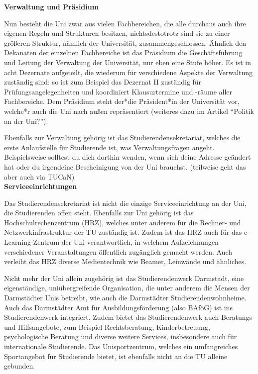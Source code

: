 {    \textbf{Verwaltung und Präsidium}

    Nun besteht die Uni zwar aus vielen Fachbereichen, die alle durchaus auch ihre eigenen Regeln und Strukturen besitzen, nichtsdestotrotz sind sie zu einer größeren Struktur, nämlich der Universität, zusammengeschlossen. Ähnlich den Dekanaten der einzelnen Fachbereiche ist das Präsidium die Geschäftsführung und Leitung der Verwaltung der Universität, nur eben eine Stufe höher. Es ist in acht Dezernate aufgeteilt, die wiederum für verschiedene Aspekte der Verwaltung zuständig sind: so ist zum Beispiel das Dezernat II zuständig für Prüfungsangelegenheiten und koordiniert Klausurtermine und -räume aller Fachbereiche. Dem Präsidium steht der*die Präsident*in der Universität vor, welche*r auch die Uni nach außen repräsentiert (weiteres dazu im Artikel "`Politik an der Uni?"').

    Ebenfalls zur Verwaltung gehörig ist das Studierendensekretariat, welches die erste Anlaufstelle für Studierende ist, was Verwaltungsfragen angeht. Beispielsweise solltest du dich dorthin wenden, wenn sich deine Adresse geändert hat oder du irgendeine Bescheinigung von der Uni brauchst. (teilweise geht das aber auch via TUCaN)\\

    \textbf{Serviceeinrichtungen}

    Das Studierendensekretariat ist nicht die einzige Serviceeinrichtung an der Uni, die Studierenden offen steht. Ebenfalls zur Uni gehörig ist das Hochschulrechenzentrum (HRZ), welches unter anderem für die Rechner- und Netzwerkinfrastruktur der TU zuständig ist. Zudem ist das HRZ auch für das e-Learning-Zentrum der Uni verantwortlich, in welchem Aufzeichnungen verschiedener Veranstaltungen öffentlich zugänglich gemacht werden. Auch verleiht das HRZ diverse Medientechnik wie Beamer, Leinwände und ähnliches.

    Nicht mehr der Uni allein zugehörig ist das Studierendenwerk Darmstadt, eine eigenständige, uniübergreifende Organisation, die unter anderem die Mensen der Darmstädter Unis betreibt, wie auch die Darmstädter Studierendenwohnheime. Auch das Darmstädter Amt für Ausbildungsförderung (also BAföG) ist ins Studierendenwerk integriert. Zudem bietet das Studierendenwerk auch Beratungs- und Hilfsangebote, zum Beispiel Rechtsberatung, Kinderbetreuung, psychologische Beratung und diverse weitere Services, insbesondere auch für internationale Studierende. Das Unisportzentrum, welches ein umfangreiches Sportangebot für Studierende bietet, ist ebenfalls nicht an die TU alleine gebunden.

}
